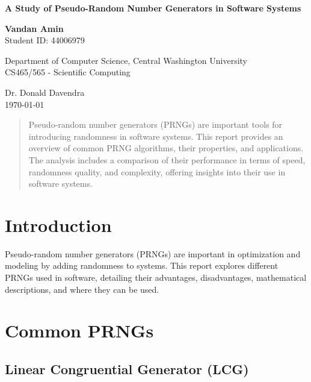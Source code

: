 \documentclass[a4paper,12pt]{report}
\begin{document}
\begin{titlepage}
    \centering
    \vspace*{2cm}
    
    \Huge
    \textbf{A Study of Pseudo-Random Number Generators in Software Systems}
    
    \vspace{1.5cm}
    
    \Large
    \textbf{Vandan Amin} \\
    Student ID: 44006979
    
    \vspace{0.5cm}
    Department of Computer Science, Central Washington University
    \\ CS465/565 - Scientific Computing

    \vspace{0.5cm}
    Dr. Donald Davendra
    \\ \today
    \vfill

\end{titlepage}

\tableofcontents

\newpage
\begin{abstract}
    Pseudo-random number generators (PRNGs) are important tools for introducing randomness in software systems. This report provides an overview of common PRNG algorithms, their properties, and applications. The analysis includes a comparison of their performance in terms of speed, randomness quality, and complexity, offering insights into their use in software systems.
\end{abstract}

\newpage

\section{Introduction}
Pseudo-random number generators (PRNGs) are important in optimization and modeling by adding randomness to systems. This report explores different PRNGs used in software, detailing their advantages, disadvantages, mathematical descriptions, and where they can be used.

\section{Common PRNGs}

\subsection{Linear Congruential Generator (LCG)}
\end{document}
